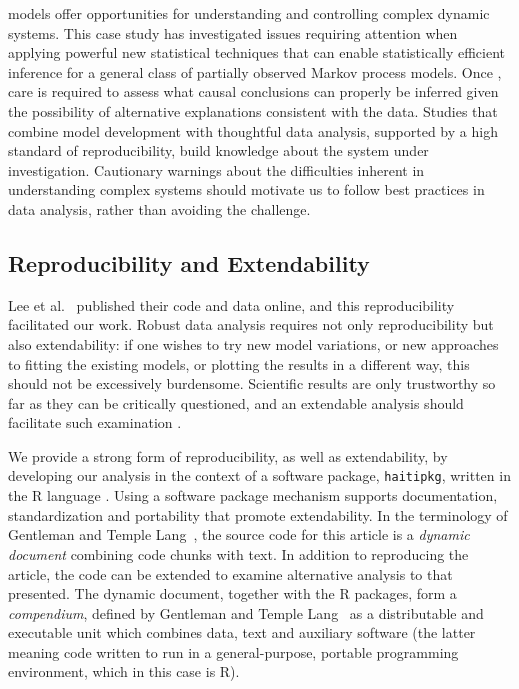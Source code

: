 \documentclass[10pt,letterpaper]{article}\usepackage[]{graphicx}\usepackage[table]{xcolor}
\newcommand\code[1]{\texttt{#1}}
\begin{document}
  models offer opportunities for understanding and controlling complex dynamic systems.
This case study has investigated issues requiring attention when applying powerful new statistical techniques that can enable statistically efficient inference for a general class of partially observed Markov process models.
Once  , care is required to assess what causal conclusions can properly be inferred given the possibility of alternative explanations consistent with the data.
Studies that combine model development with thoughtful data analysis, supported by a high standard of reproducibility, build knowledge about the system under investigation.
Cautionary warnings about the difficulties inherent in understanding complex systems \cite{saltelli20,ioannidis20,ganusov16} should motivate us to follow best practices in data analysis, rather than avoiding the challenge.

\subsection*{Reproducibility and Extendability}

Lee et al.~\cite{lee20} published their code and data online, and this reproducibility facilitated our work.
Robust data analysis requires not only reproducibility but also extendability: if one wishes to try new model variations, or new approaches to fitting the existing models, or plotting the results in a different way, this should not be excessively burdensome.
Scientific results are only trustworthy so far as they can be critically questioned, and an extendable analysis should facilitate such examination \cite{gentleman07}.

We provide a strong form of reproducibility, as well as extendability, by developing our analysis in the context of a software package, \code{haitipkg}, written in the R language \cite{r}.
Using a software package mechanism supports documentation, standardization and portability that promote extendability.
In the terminology of Gentleman and Temple Lang~\cite{gentleman07}, the source code for this article is a {\it dynamic document} combining code chunks with text.
In addition to reproducing the article, the code can be extended to examine alternative analysis to that presented.
The dynamic document, together with the R packages, form a {\it compendium}, defined by Gentleman and Temple Lang~\cite{gentleman07} as a distributable and executable unit which combines data, text and auxiliary software (the latter meaning code written to run in a general-purpose, portable programming environment, which in this case is R).
\end{document}
